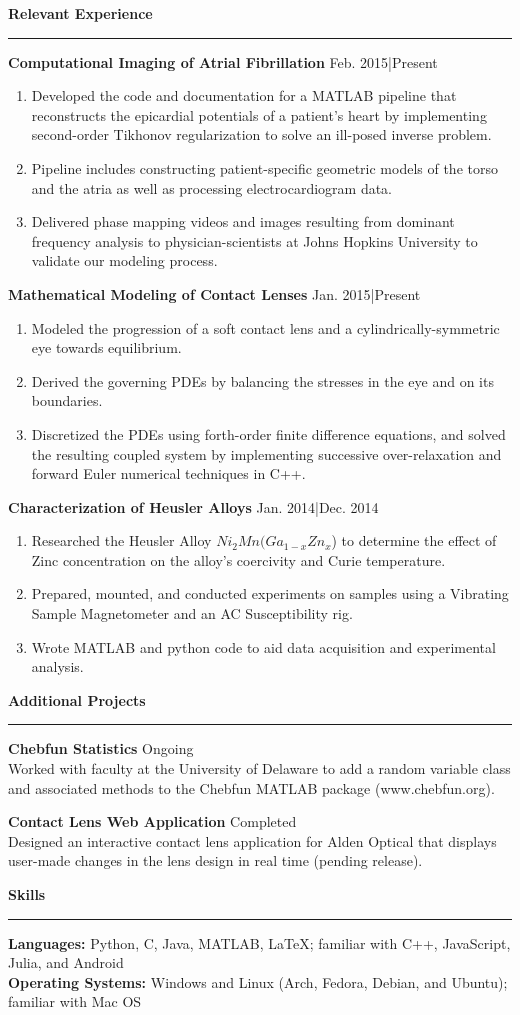 \documentclass{article}
\newcommand{\fullbar}{\rule{\textwidth}{0.4pt}} %
\newcommand{\heading}[1]{{\Large\textbf{#1}\vspace{-.2cm}\newline\fullbar}} %
\newcommand{\job}[3]{
	\item\textbf{#1} \hfill #2|#3\\
	}
\newcommand{\proj}[2]{
	\item\textbf{#1} \hfill #2\\
}
\newcommand{\secspace}{.3 cm}
\newcommand{\dash}{\item[-]}
\begin{document}
\vspace{\secspace}
\heading{Relevant Experience}
\begin{description}
\job{Computational Imaging of Atrial Fibrillation}{Feb. 2015}{Present}
\begin{enumerate}
	\vspace{-.6cm}
	\dash Developed the code and documentation for a MATLAB pipeline that reconstructs the epicardial  potentials of a patient's heart by implementing second-order Tikhonov regularization to solve an ill-posed inverse problem. 
	\dash Pipeline includes constructing patient-specific geometric models of the torso and the atria as well as processing electrocardiogram data.
	\dash Delivered phase mapping videos and images resulting from dominant frequency analysis to physician-scientists at Johns Hopkins University to validate our modeling process.
\end{enumerate}

\job{Mathematical Modeling of Contact Lenses}{Jan. 2015}{Present}
\begin{enumerate}
	\vspace{-.6cm}
	\dash Modeled the progression of a soft contact lens and a cylindrically-symmetric eye towards equilibrium.
	\dash Derived the governing PDEs by balancing the stresses in the eye and on its boundaries.
	\dash Discretized the PDEs using forth-order finite difference equations, and solved the resulting coupled system by implementing successive over-relaxation and forward Euler numerical techniques in C++.
\end{enumerate}
\job{Characterization of Heusler Alloys}{Jan. 2014}{Dec. 2014}
\begin{enumerate}
	\vspace{-.6cm}
	\dash Researched the Heusler Alloy $Ni_2Mn(Ga_{1-x}Zn_x$) to determine the effect of Zinc concentration on the alloy's coercivity  and  Curie temperature.
	\dash Prepared,  mounted, and conducted experiments on samples using a Vibrating Sample Magnetometer and an AC Susceptibility rig.
	\dash Wrote MATLAB and python code to aid data acquisition and experimental analysis.
\end{enumerate}
\end{description}
\vspace{\secspace}
\heading{Additional Projects}
\begin{description}
\proj{Chebfun Statistics}{ Ongoing }
	Worked with faculty at the University of Delaware to add a random variable class and associated methods to the Chebfun MATLAB package (www.chebfun.org).
\proj{Contact Lens Web Application}{ Completed }	
	Designed an interactive contact lens application for Alden Optical that displays user-made changes in the lens design in real time (pending release).
\end{description}

\vspace{\secspace}
\heading{Skills}
\textbf{Languages:} \hfill Python, C, Java, MATLAB, \LaTeX; familiar with C++, JavaScript, Julia, and Android\\
\textbf{Operating Systems:} \hfill Windows and Linux (Arch, Fedora, Debian, and Ubuntu); familiar with Mac OS
\end{document}
